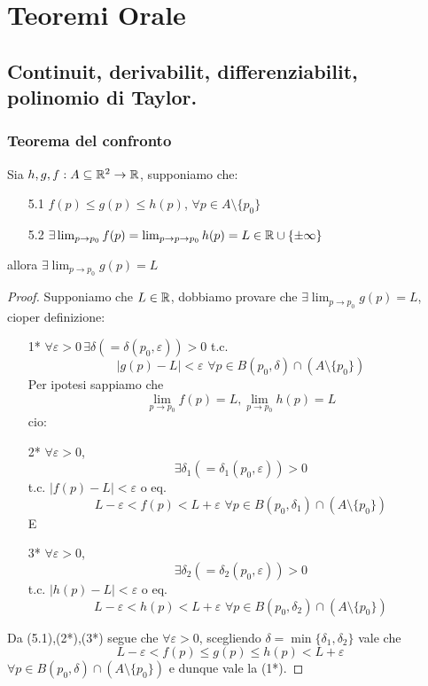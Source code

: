 \chapter{Teoremi Orale}
\section{Continuit\aca, derivabilit\aca, differenziabilit\aca, polinomio di Taylor.}
\subsection{Teorema del confronto}
\begin{theorem}
  Sia $h,g,f: A \subseteq \mathbb{R}^2 \to \mathbb{R}$, supponiamo che:
  \begin{itemize}
    \item[5.1] $f(p) \leq g(p) \leq h(p)$, $\forall p \in A \setminus \{p_0\}$
    \item[5.2] $\exists\lim_{p \to p_0} f(p) = \lim_{p \to p\to p_0} h(p) = L \in \mathbb{R} \cup \{\pm \infty\}$
  \end{itemize}
  allora $\exists \lim_{p \to p_0} g(p) = L$
  \begin{proof}
    Supponiamo che $L \in \mathbb{R}$, dobbiamo provare che $\exists \lim_{p\to p_0} g(p) = L$, cio\ace per definizione:
    \begin{itemize}
      \item[1*] $\forall \varepsilon > 0 \, \exists \delta \left(=\delta(p_0, \varepsilon)\right) > 0$
                t.c. 
                $$\lvert g(p)-L\rvert < \varepsilon \, \,\forall p \in B(p_0,\delta) \cap (A \setminus \{p_0\})$$
                Per ipotesi sappiamo che 
                  $$\lim_{p\to p_0} f(p) = L, \lim_{p\to p_0} h(p) = L $$
                cio\ace: 
      \item[2*] $\forall \varepsilon > 0 $, $$\exists \delta_1 \left(=\delta_1(p_0, \varepsilon)\right) > 0$$ t.c. 
                $\lvert f(p)-L\rvert < \varepsilon$ o eq.
                $$L - \varepsilon < f(p) < L + \varepsilon \,\, \forall p \in B(p_0,\delta_1) \cap (A \setminus \{p_0\})$$
                E
      \item[3*] $\forall \varepsilon > 0 $, $$\exists \delta_2 \left(=\delta_2(p_0, \varepsilon)\right) > 0$$
                t.c. 
                $\lvert h(p)-L\rvert < \varepsilon$ o eq.
                $$L - \varepsilon < h(p) < L + \varepsilon \, \, \forall p \in B(p_0,\delta_2) \cap (A \setminus \{p_0\})$$
    \end{itemize} 
    Da (5.1),(2*),(3*) segue che $\forall \varepsilon > 0$, scegliendo $\delta = \min\{\delta_1,\delta_2\}$ vale che 
    $$L - \varepsilon < f(p) \leq g(p) \leq h(p) < L+\varepsilon$$ $\forall p \in B(p_0,\delta) \cap (A \setminus \{p_0\})$ 
    e dunque vale la (1*).
  \end{proof}
\end{theorem}